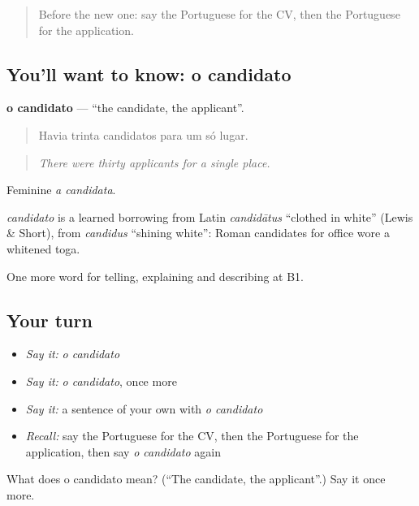 \begin{quote}
Before the new one: say the Portuguese for the CV, then the Portuguese for the application.
\end{quote}

\subsection*{You'll want to know: o candidato}
\textbf{o candidato} — \textquotedblleft{}the candidate, the applicant\textquotedblright{}.

\begin{quote}
Havia trinta candidatos para um só lugar.
\end{quote}

\begin{quote}
\emph{There were thirty applicants for a single place.}
\end{quote}

Feminine \emph{a candidata}.

\begin{cousinweb}
\emph{candidato} is a learned borrowing from Latin \emph{candidātus} \textquotedblleft{}clothed in white\textquotedblright{} (Lewis \& Short), from \emph{candidus} \textquotedblleft{}shining white\textquotedblright{}: Roman candidates for office wore a whitened toga.
\end{cousinweb}

\begin{grammarlens}[title={What you've built}]
One more word for telling, explaining and describing at B1.
\end{grammarlens}

\subsection*{Your turn}
\begin{itemize}
\raggedright
  \item \emph{Say it:} \emph{o candidato}
  \item \emph{Say it:} \emph{o candidato}, once more
  \item \emph{Say it:} a sentence of your own with \emph{o candidato}
  \item \emph{Recall:} say the Portuguese for the CV, then the Portuguese for the application, then say \emph{o candidato} again
\end{itemize}

\begin{tcolorbox}[breakable,colback=teal!4,colframe=teal!35!black,title={Before you move on}]
What does o candidato mean? (\textquotedblleft{}The candidate, the applicant\textquotedblright{}.) Say it once more.
\end{tcolorbox}
